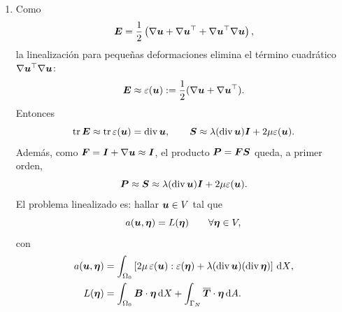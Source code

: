 \documentclass[11pt]{article}
\def\vec   #1{\mbox{\boldmath $#1$}{}}
\def\ten   #1{\mbox{\boldmath $#1$}{}}
\def\dX{\mbox{\(\,\mathrm{d}X\)}}
\def\dA{\mbox{\(\,\mathrm{d}A\)}}
\DeclareMathOperator{\dive}{div}
\DeclareMathOperator{\tr}{tr}
\begin{document}
\begin{enumerate}[label=\textbf{\arabic*.}, leftmargin=*]
\begin{enumerate}[label=(\alph*)]
        \item Como
        \[
            \ten E
            =
            \frac12\left(\nabla\vec u+\nabla\vec u^\top+\nabla\vec u^\top\nabla\vec u\right),
        \]
        la linealización para pequeñas deformaciones elimina el término cuadrático $\nabla\vec u^\top\nabla\vec u$:
        \[
            \ten E\approx \varepsilon(\vec u)
            :=
            \frac12(\nabla\vec u+\nabla\vec u^\top).
        \]
        Entonces
        \[
            \tr\ten E
            \approx
            \tr\varepsilon(\vec u)
            =
            \dive\vec u,
            \qquad
            \ten S
            \approx
            \lambda(\dive\vec u)\ten I+2\mu\varepsilon(\vec u).
        \]
        Además, como $\ten F=\ten I+\nabla\vec u\approx\ten I$, el producto $\ten P=\ten F\ten S$ queda, a primer orden,
        \[
            \ten P
            \approx
            \ten S
            \approx
            \lambda(\dive\vec u)\ten I+2\mu\varepsilon(\vec u).
        \]
        El problema linealizado es: hallar $\vec u\in V$ tal que
        \[
            a(\vec u,\vec\eta)=L(\vec\eta)\qquad\forall\vec\eta\in V,
        \]
        con
        \[
        \begin{aligned}
            a(\vec u,\vec\eta)
            &=
            \int_{\Omega_0}
            \left[
            2\mu\,\varepsilon(\vec u):\varepsilon(\vec\eta)
            +\lambda(\dive\vec u)(\dive\vec\eta)
            \right]\dX,\\
            L(\vec\eta)
            &=
            \int_{\Omega_0}\vec B\cdot\vec\eta\dX
            +\int_{\Gamma_N}\overline{\vec T}\cdot\vec\eta\dA.
        \end{aligned}
        \]


\end{enumerate}
\end{enumerate}
\end{document}
